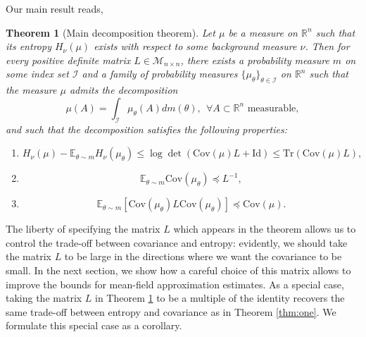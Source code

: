 \documentclass[12pt]{article}
\def \RR {\mathbb R}
\def \Tr {\mathrm{Tr}}
\def \EE {\mathbb E}
\def \Cov {\mathrm {Cov}}
\def \Id {\mathrm{Id}}
\def \Cov {\mathrm{Cov}}
\newtheorem{theorem}{Theorem}
\theoremstyle{definition}
\theoremstyle{remark}
\begin{document}
Our main result reads,
\begin{theorem}[Main decomposition theorem] \label{thm:main}
Let $\mu$ be a measure on $\RR^n$ such that its entropy $H_\nu(\mu)$ exists with respect to some background measure $\nu$. Then for every positive definite matrix $L \in \mathcal{M}_{n \times n}$, there exists a probability measure $m$ on some index set $\mathcal{I}$ and a family of 
probability measures $\{\mu_\theta \}_{\theta \in \mathcal{I}}$ on $\RR^n$ such that the measure $\mu$ admits the decomposition
\begin{equation}\label{eq:decomp}
\mu(A) = \int_{\mathcal{I}} \mu_\theta(A) d m(\theta), ~~ \forall A \subset \RR^n \mbox{ measurable},
\end{equation}
and such that the decomposition satisfies the following properties:
\begin{enumerate}
\item
\begin{equation}\label{eq:est-ent}
H_\nu(\mu) - \EE_{\theta \sim m} H_\nu(\mu_\theta) \leq \log \det (\Cov (\mu) L + \Id) \leq \Tr (\Cov(\mu) L),
\end{equation}
\item
\begin{equation}\label{eq:est2}
\EE_{\theta \sim m} \Cov(\mu_\theta) \preceq L^{-1},
\end{equation}
\item
\begin{equation}\label{eq:est1}
\EE_{\theta \sim m} \left [\Cov(\mu_\theta) L \Cov(\mu_\theta) \right ]  \preceq \Cov(\mu).
\end{equation}
\end{enumerate}
\end{theorem}	
\bigskip

The liberty of specifying the matrix $L$ which appears in the theorem allows us to control the trade-off between covariance and entropy: evidently, we should take the matrix $L$ to be large in the directions where we want the covariance to be small. In the next section, we show how a careful choice of this matrix allows to improve the bounds for mean-field approximation estimates. As a special case, taking the matrix $L$ in Theorem \ref{thm:main} to be a multiple of the identity recovers the same trade-off between entropy and covariance as in Theorem \ref{thm:one}. We formulate this special case as a corollary.
\end{document}
